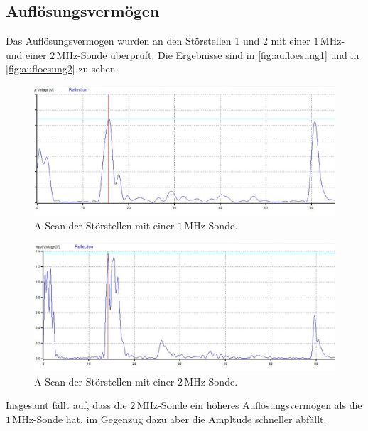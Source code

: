 \subsection{Auflösungsvermögen}
\label{sec:Aufloesungvermoegen}
Das Auflösungsvermogen wurden an den Störstellen 1 und 2 mit einer $1\,\unit{\mega\hertz}$- und einer
$2\,\unit{\mega\hertz}$-Sonde überprüft. Die Ergebnisse sind in \autoref{fig:aufloesung1}  und in
\autoref{fig:aufloesung2} zu sehen.
\begin{figure}
    \centering
    \includegraphics{messwerte/UntersuchungAufloesungsvermoegen/1MhzNo1.jpg}
    \caption{A-Scan der Störstellen mit einer $1\,\unit{\mega\hertz}$-Sonde.}
    \label{fig:aufloesung1}
\end{figure}

\begin{figure}
  \centering
  \includegraphics{messwerte/UntersuchungAufloesungsvermoegen/2MhzNo1.jpg}
  \caption{A-Scan der Störstellen mit einer $2\,\unit{\mega\hertz}$-Sonde.}
  \label{fig:aufloesung2}
\end{figure}
Insgesamt fällt auf, dass die $2\,\unit{\mega\hertz}$-Sonde ein höheres Auflösungsvermögen
als die $1\,\unit{\mega\hertz}$-Sonde hat, im Gegenzug dazu aber die Ampltude schneller abfällt.

